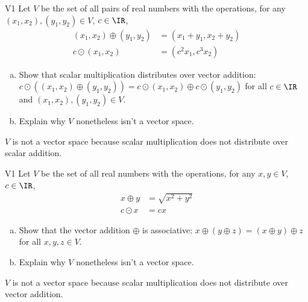 \begin{problem}{V1}
 Let \(V\) be the set of all pairs of real numbers with the operations, for any \((x_1,x_2), (y_1,y_2) \in V\), \(c\in \IR\),
 \begin{align*}
 (x_1,x_2) \oplus (y_1,y_2) &= (x_1+y_1,x_2+y_2) \\
 c \odot (x_1,x_2) &= (c^2x_1, c^3x_2)
 \end{align*}
 \begin{enumerate}[(a)]
 \item Show that scalar multiplication distributes over vector addition:
       \(c\odot((x_1,x_2) \oplus (y_1,y_2))=c\odot(x_1,x_2) \oplus c\odot(y_1,y_2)\) for all \(c \in \IR\) and \( (x_1,x_2), (y_1,y_2) \in V\).
\item Explain why \(V\) nonetheless isn't a vector space.
 \end{enumerate}
\end{problem}
 \begin{solution}
 \(V\) is not a vector space because scalar multiplication does not distribute over scalar addition.
 \end{solution}

\begin{problem}{V1}
 Let \(V\) be the set of all real numbers with the operations, for any \(x,y\in V\), \(c\in \IR\),
 \begin{align*}
 x \oplus y &= \sqrt{x^2+y^2} \\
 c \odot x &= c x
 \end{align*}
 \begin{enumerate}[(a)]
 \item Show that the vector addition \(\oplus\) is associative:
       \(x \oplus (y \oplus z)=(x\oplus y)\oplus z\) for all \(x,y,z \in V\).
\item Explain why \(V\) nonetheless isn't a vector space.
 \end{enumerate}
\end{problem}
\begin{solution}
\(V\) is not a vector space because scalar multiplication does not distribute over vector addition.
\end{solution}

